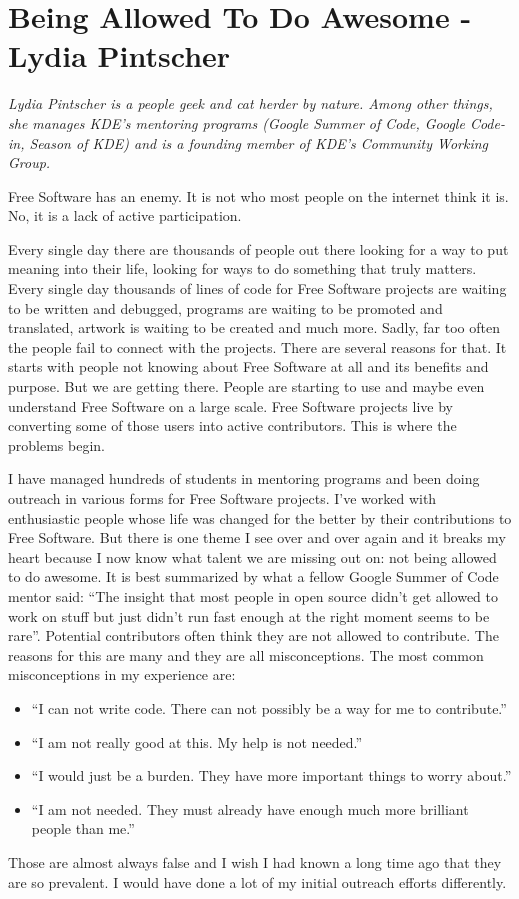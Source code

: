 \chapter{Being Allowed To Do Awesome - Lydia Pintscher}

\textit{Lydia Pintscher is a people geek and cat herder by nature. Among other
things, she manages KDE's mentoring programs (Google Summer of Code, Google
Code-in, Season of KDE) and is a founding member of KDE's Community Working
Group.}

Free Software has an enemy. It is not who most people on the internet think it
is. No, it is a lack of active participation.

Every single day there are thousands of people out there looking for a way to
put meaning into their life, looking for ways to do something that truly
matters. Every single day thousands of lines of code for Free Software projects
are waiting to be written and debugged, programs are waiting to be promoted and
translated, artwork is waiting to be created and much more. Sadly, far too often
the people fail to connect with the projects. There are several reasons for
that. It starts with people not knowing about Free Software at all and its
benefits and purpose. But we are getting there. People are starting to use and
maybe even understand Free Software on a large scale. Free Software projects
live by converting some of those users into active contributors. This is where
the problems begin.

I have managed hundreds of students in mentoring programs and been doing
outreach in various forms for Free Software projects. I've worked with
enthusiastic people whose life was changed for the better by their contributions
to Free Software. But there is one theme I see over and over again and it breaks
my heart because I now know what talent we are missing out on: not being allowed
to do awesome. It is best summarized by what a fellow Google Summer of Code
mentor said: ``The insight that most people in open source didn’t get allowed to
work on stuff but just didn’t run fast enough at the right moment seems to be
rare''. Potential contributors often think they are not allowed to contribute.
The reasons for this are many and they are all misconceptions. The most common
misconceptions in my experience are:
\begin{itemize}
 \item ``I can not write code. There can not possibly be a way for me to
contribute.''
 \item ``I am not really good at this. My help is not needed.''
 \item ``I would just be a burden. They have more important things to worry
about.''
 \item ``I am not needed. They must already have enough much more brilliant
people than me.''
\end{itemize}
Those are almost always false and I wish I had known a long time ago that they
are so prevalent. I would have done a lot of my initial outreach efforts
differently.


